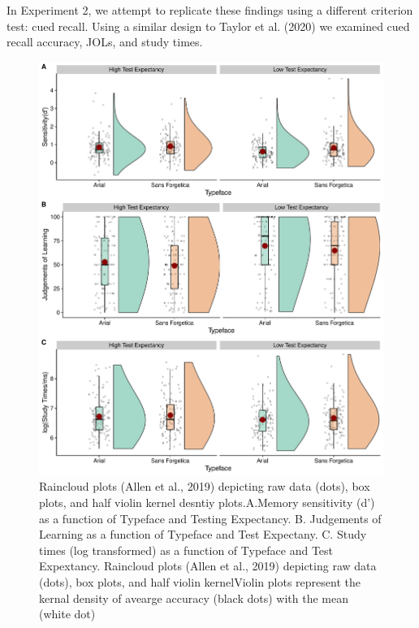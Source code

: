 \documentclass[
  english,
  jou]{apa6}
\begin{document}
In Experiment 2, we attempt to replicate these findings using a different criterion test: cued recall. Using a similar design to Taylor et al. (2020) we examined cued recall accuracy, JOLs, and study times.

\begin{figure}

{\centering \includegraphics{Testing_Expectancy_SF_files/figure-latex/unnamed-chunk-15-1} 

}

\caption{Raincloud plots (Allen et al., 2019) depicting raw data (dots), box plots, and half violin kernel desntiy plots.A.Memory sensitivity (d') as a function of Typeface and Testing Expectancy. B. Judgements of Learning as a function of Typeface and Test Expectany. C. Study times (log transformed) as a function of Typeface and Test Expextancy. Raincloud plots (Allen et al., 2019) depicting raw data (dots), box plots, and half violin kernelViolin plots represent the kernal density of avearge accuracy (black dots) with the mean (white dot)}\label{fig:unnamed-chunk-15}
\end{figure}
\end{document}
